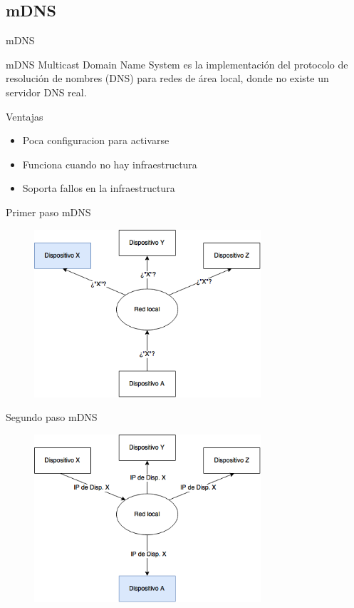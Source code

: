 \subsection{mDNS}

\begin{frame}{mDNS}
	\begin{block}{mDNS}
		Multicast Domain Name System es la implementación del protocolo de resolución de nombres (DNS) para redes de área local, donde no existe un servidor DNS real.		
	\end{block}
	
	\begin{block}{Ventajas}
		\begin{itemize}
			\item Poca configuracion para activarse
			\item Funciona cuando no hay infraestructura
			\item Soporta fallos en la infraestructura
		\end{itemize}
	\end{block}
\end{frame}


\begin{frame}{Primer paso mDNS}
	\begin{figure}[H]
		\centering
		\includegraphics[width=0.75\textwidth]{./Imagenes/mdns1.png}
		\label{fig:mdns1}
	\end{figure}
\end{frame}

\begin{frame}{Segundo paso mDNS}
	\begin{figure}[H]
		\centering
		\includegraphics[width=0.75\textwidth]{./Imagenes/mdns2.png}
		\label{fig:mdns2}
	\end{figure}
\end{frame}




